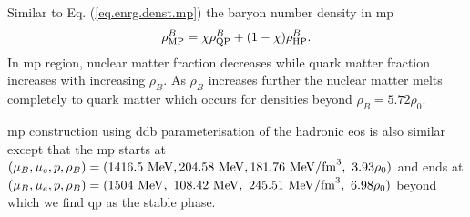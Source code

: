 \documentclass[a4paper, 11pt]{article}
\begin{document}
Similar to Eq. (\ref{eq.enrg.denst.mp}) the baryon number density in \ac{mp} 
\begin{equation}
\rho^B_{\rm MP} = \chi \rho^B_{\rm QP} + (1-\chi)\rho^B_{\rm HP}.
\end{equation} 
In \ac{mp} region, nuclear matter fraction decreases while quark matter fraction increases 
with increasing $\rho_B$. As $\rho_B$ increases further the nuclear matter melts completely 
to quark matter which occurs for densities beyond $\rho_B = 5.72 \rho_0$. 

\ac{mp} construction using \ac{ddb} parameterisation of the hadronic \ac{eos} is also similar except that the \ac{mp} starts at $(\mu_B, \mu_e, p, \rho_{B}) = (1416.5\ {\rm MeV}, 204.58\ {\rm MeV}, 181.76\ {\rm MeV/fm}^3,\ 3.93 \rho_0)$ and ends at $(\mu_B, \mu_e, p, \rho_{B}) = (1504\ {\rm MeV},\ 108.42\ {\rm MeV},\ 245.51\ {\rm MeV/fm}^3,\ 6.98 \rho_0)$  beyond which we find \ac{qp} as the stable phase.
\end{document}
